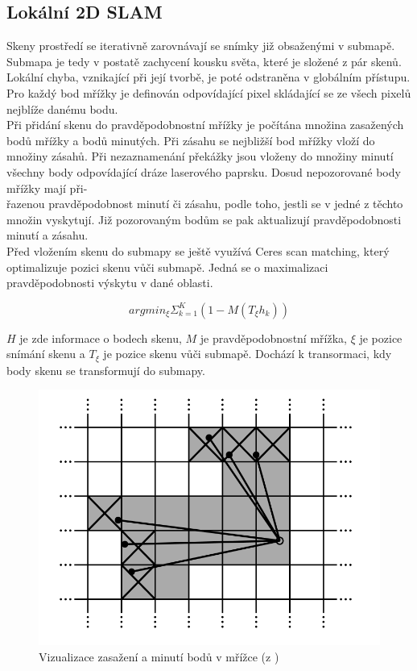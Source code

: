 \documentclass[12pt]{report}
\begin{document}
\subsection{Lokální 2D SLAM}
\indent Skeny prostředí se iterativně zarovnávají se snímky již obsaženými v submapě. Submapa je tedy v postatě zachycení kousku světa, které je složené z pár skenů. Lokální chyba, vznikající při její tvorbě, je poté odstraněna v globálním přístupu. Pro každý bod mřížky je definován odpovídající pixel skládající se ze všech pixelů nejblíže danému bodu.\\
\indent Při přidání skenu do pravděpodobnostní mřížky je počítána množina zasažených bodů mřížky a bodů minutých. Při zásahu se nejbližší bod mřížky vloží do množiny zásahů. Při nezaznamenání překážky jsou vloženy do množiny minutí všechny body odpovídající dráze laserového paprsku. Dosud nepozorované body mřížky mají při-\\řazenou pravděpodobnost minutí či zásahu, podle toho, jestli se v jedné z těchto množin vyskytují. Již pozorovaným bodům se pak aktualizují pravděpodobnosti minutí a zásahu.\\
\indent Před vložením skenu do submapy se ještě využívá Ceres scan matching, který optimalizuje pozici skenu vůči submapě. Jedná se o maximalizaci pravděpodobnosti výskytu v dané oblasti.  

\begin{equation}
argmin_\xi\Sigma^K_{k=1}(1-M(T_{\xi}h_k))
\end{equation}

$H$ je zde informace o bodech skenu, $M$ je pravděpodobnostní mřížka, $\xi$ je pozice snímání skenu a $T_{\xi}$ je pozice skenu vůči submapě. Dochází k transormaci, kdy body skenu se transformují do submapy.

\begin{figure}[!ht]
	\begin{center}
		\includegraphics[width=0.7\columnwidth]{imgs/cartographer.png}
	\end{center}
	\caption{Vizualizace zasažení a minutí bodů v mřížce (z \cite{Hess2016a})}
	\label{fig:cartographer}
\end{figure}
\end{document}

